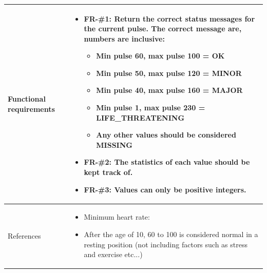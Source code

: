 \documentclass[a4paper]{article}
\begin{document}
\begin{longtable}[l]{ | >{\columncolor{vu-grey-50}}m{110pt} | m{300pt} | }
    Functional requirements &
    \begin{itemize}
        \item \textbf{FR-\#1}: Return the correct status messages for the current pulse. The correct message are, numbers are inclusive:
            \begin{itemize}
                \item Min pulse 60, max pulse 100 = OK
                \item Min pulse 50, max pulse 120 = MINOR
                \item Min pulse 40, max pulse 160 = MAJOR
                \item Min pulse 1, max pulse 230 = LIFE\_THREATENING
                \item Any other values should be considered MISSING
            \end{itemize}
        \item \textbf{FR-\#2}: The statistics of each value should be kept track of.
        \item \textbf{FR-\#3}: Values can only be positive integers.
    \end{itemize}
    \\ \hline
    
    References &
    \begin{itemize}
        \item Minimum heart rate: \cite{resting-heart-rate}
        \item After the age of 10, 60 to 100 is considered normal in a resting position (not including factors such as stress and exercise etc...) \cite{target-training-heart-rates, target-heart-rates}
    \end{itemize}
    \\ \hline
    
\end{longtable}




\clearpage
\end{document}
